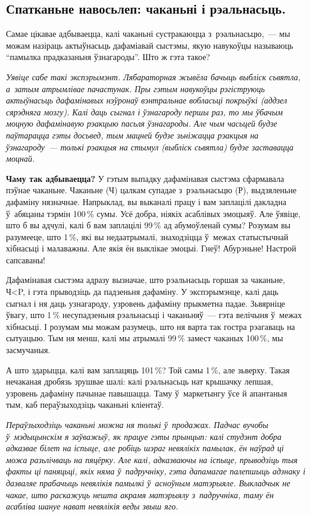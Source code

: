 \subsection*{Спатканьне навосьлеп: чаканьні і рэальнасьць.}

Самае цікавае адбываецца, калі чаканьні сустракаюцца з~рэальнасьцю,~--- мы можам назіраць актыўнасьць дафаміавай сыстэмы, якую навукоўцы называюць ``памылка прадказаньня ўзнагароды''. Што ж гэта такое?

\emph{Уявіце сабе такі экспэрымэнт. Лябараторная жывёла бачыць выбліск сьвятла, а~затым атрымлівае пачастунак. Пры гэтым навукоўцы рэгіструюць актыўнасьць дафамінавых нэўронаў вэнтральнае вобласьці покрыўкі (аддзел сярэдняга мозгу). Калі даць сыгнал і ўзнагароду першы раз, то мы ўбачым моцную дафамінавую рэакцыю пасьля ўзнагароды. Але чым часьцей будзе паўтарацца гэты досьвед, тым мацней будзе зьніжацца рэакцыя на ўзнагароду~--- толькі рэакцыя на стымул (выбліск сьвятла) будзе заставацца моцнай.}

\textbf{Чаму так адбываецца?} У гэтым выпадку дафамінавая сыстэма сфармавала пэўнае чаканьне. Чаканьне (Ч) цалкам супадае з~рэальнасьцю (Р), выдзяленьне дафаміну нязначнае. Напрыклад, вы выканалі працу і вам заплацілі дакладна ў~абяцаны тэрмін 100\,\% сумы. Усё добра, ніякіх асаблівых эмоцыяў. Але ўявіце, што б вы адчулі, калі б вам заплацілі 99\,\% ад абумоўленай сумы? Розумам вы разумееце, што 1\,\%, які вы недаатрымалі, знаходзіцца ў~межах статыстычнай хібнасьці і малаважны. Але якія ён выклікае эмоцыі. Гнеў! Абурэньне! Настрой сапсаваны!

Дафамінавая сыстэма адразу вызначае, што рэальнасьць горшая за чаканьне, Ч<P, і гэта прыводзіць да падзеньня дафаміну. У экспэрымэнце, калі даць сыгнал і ня даць узнагароду, узровень дафаміну прыкметна падае. Зьвярніце ўвагу, што 1\,\% несупадзеньня рэальнасьці і чаканьняў~--- гэта велічыня ў~межах хібнасьці. І розумам мы можам разумець, што ня варта так гостра рэагаваць на сытуацыю. Тым ня менш, калі мы атрымалі 99\,\% замест чаканых 100\,\%, мы засмучаныя.

А што здарыцца, калі вам заплацяць 101\,\%? Той самы 1\,\%, але зьверху. Такая нечаканая дробязь зрушвае шалі: калі рэальнасьць нат крышачку лепшая, узровень дафаміну пачынае павышацца. Таму ў~маркетынгу ўсе й апантаныя тым, каб пераўзыходзіць чаканьні кліентаў.

\emph{Пераўзыходзіць чаканьні можна ня толькі ў~продажах. Падчас вучобы ў~мэдыцынскім я заўважыў, як працуе гэты прынцып: калі студэнт добра адказвае білет на іспыце, але робіць шэраг невялікіх памылак, ён наўрад ці можа разьлічваць на пяцёрку. Але калі, адказваючы на іспыце, прыводзіць тыя факты ці паняцьці, якіх няма ў~падручніку, гэта дапамагае палепшыць адзнаку і дазваляе прабачыць невялікія памылкі ў~асноўным матэрыяле. Выкладчык не чакае, што раскажуць нешта акрамя матэрыялу з~падручніка, таму ён асабліва шануе нават невялікія веды звыш яго.}

